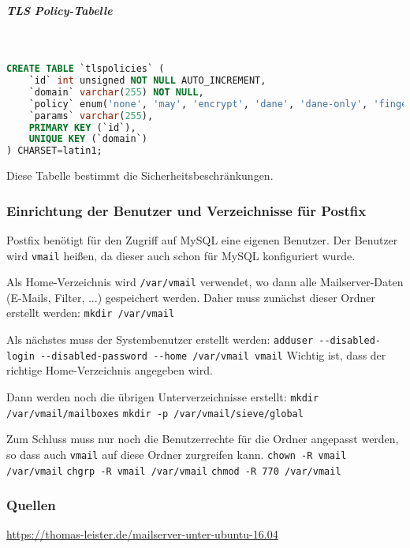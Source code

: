 \subparagraph{TLS Policy-Tabelle}\mbox{}\\
\begin{lstlisting}[language=SQL, caption=vmail - Alias-Tabelle]
CREATE TABLE `tlspolicies` (
	`id` int unsigned NOT NULL AUTO_INCREMENT,
	`domain` varchar(255) NOT NULL,
	`policy` enum('none', 'may', 'encrypt', 'dane', 'dane-only', 'fingerprint', 'verify', 'secure') NOT NULL,
	`params` varchar(255),
	PRIMARY KEY (`id`),
	UNIQUE KEY (`domain`)
) CHARSET=latin1;
\end{lstlisting}
Diese Tabelle bestimmt die Sicherheitsbeschränkungen.

\subsubsection{Einrichtung der Benutzer und Verzeichnisse für Postfix}
Postfix benötigt für den Zugriff auf MySQL eine eigenen Benutzer. Der Benutzer wird \verb|vmail| heißen, da dieser auch schon für MySQL konfiguriert wurde.

Als Home-Verzeichnis wird \verb|/var/vmail| verwendet, wo dann alle Mailserver-Daten (E-Mails, Filter, ...) gespeichert werden. Daher muss zunächst dieser Ordner erstellt werden:\newline
\verb|mkdir /var/vmail|\newline

Als nächstes muss der Systembenutzer erstellt werden:\newline
\verb|adduser --disabled-login --disabled-password --home /var/vmail vmail|\newline
Wichtig ist, dass der richtige Home-Verzeichnis angegeben wird.

Dann werden noch die übrigen Unterverzeichnisse erstellt:\newline
\verb|mkdir /var/vmail/mailboxes|\newline
\verb|mkdir -p /var/vmail/sieve/global|\newline

Zum Schluss muss nur noch die Benutzerrechte für die Ordner angepasst werden, so dass auch \verb|vmail| auf diese Ordner zurgreifen kann.\newline
\verb|chown -R vmail /var/vmail|\newline
\verb|chgrp -R vmail /var/vmail|\newline
\verb|chmod -R 770 /var/vmail|\newline










\subsubsection{Quellen}
\url{https://thomas-leister.de/mailserver-unter-ubuntu-16.04}


